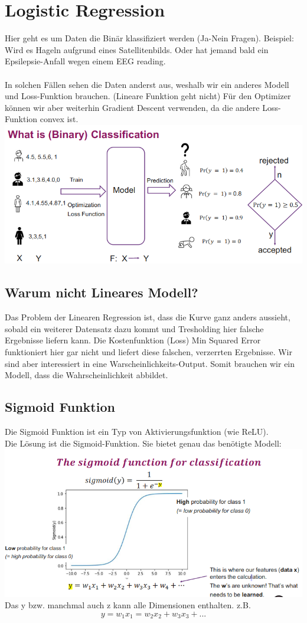 \section{Logistic Regression}
Hier geht es um Daten die Binär klassifiziert werden (Ja-Nein Fragen). Beispiel: Wird es Hageln aufgrund eines Satellitenbilds. Oder hat jemand bald ein Epsilepsie-Anfall wegen einem EEG reading. \\
\\
In solchen Fällen sehen die Daten anderst aus, weshalb wir ein anderes Modell und Loss-Funktion brauchen. (Lineare Funktion geht nicht) Für den Optimizer können wir aber weiterhin Gradient Descent verwenden, da die andere Loss-Funktion convex ist.
\includegraphics[width=\linewidth]{img/binary_classification.png}
\subsection{Warum nicht Lineares Modell?}
Das Problem der Linearen Regression ist, dass die Kurve ganz anders aussieht, sobald ein weiterer Datensatz dazu kommt und Tresholding hier falsche Ergebnisse liefern kann. Die Kostenfunktion (Loss) Min Squared Error funktioniert hier gar nicht und liefert diese falschen, verzerrten Ergebnisse. Wir sind aber interessiert in eine Warscheinlichkeits-Output. Somit brauchen wir ein Modell, dass die Wahrscheinlichkeit abbildet.
\subsection{Sigmoid Funktion}
Die Sigmoid Funktion ist ein Typ von Aktivierungsfunktion (wie ReLU).\\
Die Lösung ist die Sigmoid-Funktion. Sie bietet genau das benötigte Modell:
\includegraphics[width=\linewidth]{img/sigmoid.png}
Das y bzw. manchmal auch z kann alle Dimensionen enthalten. z.B.
$$y = w_1x_1=w_2x_2+w_3x_3+...$$

